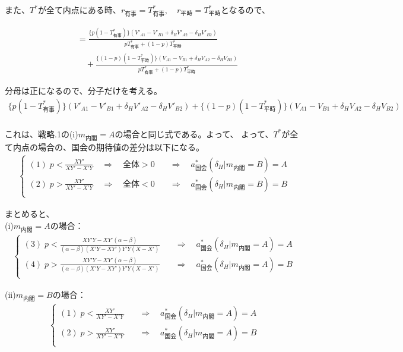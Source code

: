 \documentclass[main.tex]{subfiles}
\begin{document}
また、$T^*$が全て内点にある時、$r_{有事}=T^*_{有事}, \quad r_{平時} = T^*_{平時}$となるので、

\begin{align*}
    &= \frac{ \{p(1-T^*_{有事}) \}(V'_{A1} -V'_{B1} + \delta_H V'_{A2} - \delta_H V'_{B2})  }{ pT^*_{有事} +(1-p)T^*_{平時} }\\[1em]
    &\quad + \frac{ \{(1-p)(1-T^*_{平時}) \}(V_{A1} - V_{B1} + \delta_H V_{A2} - \delta_H V_{B2} ) }{ pT^*_{有事} + (1-p)T^*_{平時} }
\end{align*}

分母は正になるので、分子だけを考える。
\begin{align*}
    \{p(1-T^*_{有事}) \}(V'_{A1} -V'_{B1} + \delta_H V'_{A2} - \delta_H V'_{B2})    +   \{(1-p)(1-T^*_{平時}) \}(V_{A1} - V_{B1} + \delta_H V_{A2} - \delta_H V_{B2} )\\[1em]
\end{align*}

これは、戦略.1の(i)$m_{内閣}=A$の場合と同じ式である。よって、
よって、$T^*$が全て内点の場合の、国会の期待値の差分は以下になる。
\begin{align*}
    \begin{cases}
        (1)\; p < \frac{XY'}{XY' - X'Y} \quad\Rightarrow\quad 全体>0 &\quad\Rightarrow\quad a^*_{国会}(\delta_H|m_{内閣} = B) = A\\[0.5em]
        (2)\; p > \frac{XY'}{XY' - X'Y} \quad\Rightarrow\quad 全体<0 &\quad\Rightarrow\quad a^*_{国会}(\delta_H|m_{内閣} = B) = B\\[0.5em] 
     \end{cases}
\end{align*}


\bigskip
まとめると、\\
\noindent
(i)$m_{内閣}=A$の場合：
\begin{align*}
    \begin{cases}
        (3)\; p  < \frac{XY'Y - XY'(\alpha - \beta)}{ (\alpha - \beta)( X'Y- XY')Y'Y(X - X') }   &\quad\Rightarrow\quad a^*_{国会}(\delta_H|m_{内閣} = A) = A\\[0.5em]
        (4)\; p  > \frac{XY'Y - XY'(\alpha - \beta)}{ (\alpha - \beta)( X'Y- XY')Y'Y(X - X') }  &\quad\Rightarrow\quad a^*_{国会}(\delta_H|m_{内閣} = A) = B\\[0.5em] 
     \end{cases}
\end{align*}


\noindent
(ii)$m_{内閣}=B$の場合：
\begin{align*}
    \begin{cases}
        (1)\; p < \frac{XY'}{XY' - X'Y}  &\quad\Rightarrow\quad a^*_{国会}(\delta_H|m_{内閣} = A) = A\\[0.5em]
        (2)\; p > \frac{XY'}{XY' - X'Y}  &\quad\Rightarrow\quad a^*_{国会}(\delta_H|m_{内閣} = A) = B\\[0.5em] 
     \end{cases}
\end{align*}
\end{document}
